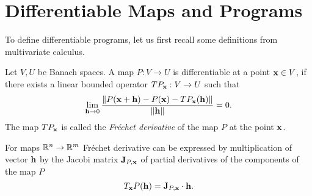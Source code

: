 \section{Differentiable Maps and Programs}
To define differentiable programs, let us first recall some
definitions from multivariate calculus.
\begin{definition}[Derivative]
  Let $V,U$ be Banach spaces. A map $P:V\to U$ is differentiable at a point
  $\mathbf{x}\in V$, if there exists a linear bounded operator $TP_{\mathbf{x}}:V\to U$ such that
  \begin{equation}
    \label{eq:frechet}
    \lim_{\mathbf{h}\to 0}\frac{\|P(\mathbf{x}+\mathbf{h})-P(\mathbf{x})-TP_{\mathbf{x}}(\mathbf{h})\|}{\|\mathbf{h}\|} = 0.
  \end{equation}
  The map $TP_{\mathbf{x}}$ is called the \emph{Fréchet derivative} of the map $P$ at the
  point $\mathbf{x}$.
\end{definition}
For maps $\mathbb{R}^n\to \mathbb{R}^m$ Fréchet derivative can be expressed by multiplication
of vector $\mathbf{h}$ by the Jacobi matrix $\mathbf{J}_{P,\mathbf{x}}$ of partial
derivatives of the components of the map $P$
\begin{equation*}
  T_{\mathbf{x}} P(\mathbf{h}) = \mathbf{J}_{P,\mathbf{x}}\cdot \mathbf{h}.
\end{equation*}

